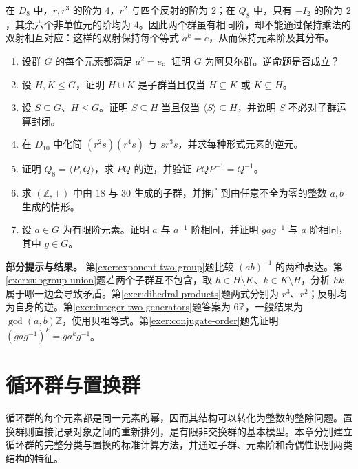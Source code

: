 \documentclass[UTF8,12pt,a4paper,fontset=fandol]{ctexbook}
\begin{document}
\begin{example}[区分两个八阶群]
在 $D_8$ 中，$r,r^3$ 的阶为 $4$，$r^2$ 与四个反射的阶为 $2$；在 $Q_8$ 中，只有 $-I_2$ 的阶为 $2$，其余六个非单位元的阶均为 $4$。因此两个群虽有相同阶，却不能通过保持乘法的双射相互对应：这样的双射保持每个等式 $a^k=e$，从而保持元素阶及其分布。
\end{example}

\begin{enumerate}
  \item\label{exer:exponent-two-group} 设群 $G$ 的每个元素都满足 $a^2=e$。证明 $G$ 为阿贝尔群。逆命题是否成立？
  \item\label{exer:subgroup-union} 设 $H,K\leq G$，证明 $H\cup K$ 是子群当且仅当 $H\subseteq K$ 或 $K\subseteq H$。
  \item\label{exer:generated-minimality} 设 $S\subseteq G$、$H\leq G$。证明 $S\subseteq H$ 当且仅当 $\langle S\rangle\subseteq H$，并说明 $S$ 不必对子群运算封闭。
  \item\label{exer:dihedral-products} 在 $D_{10}$ 中化简 $(r^2s)(r^4s)$ 与 $sr^3s$，并求每种形式元素的逆元。
  \item\label{exer:quaternion-relations} 证明 $Q_8=\langle P,Q\rangle$，求 $PQ$ 的逆，并验证 $PQP^{-1}=Q^{-1}$。
  \item\label{exer:integer-two-generators} 求 $(\mathbb Z,+)$ 中由 $18$ 与 $30$ 生成的子群，并推广到由任意不全为零的整数 $a,b$ 生成的情形。
  \item\label{exer:conjugate-order} 设 $a\in G$ 为有限阶元素。证明 $a$ 与 $a^{-1}$ 阶相同，并证明 $gag^{-1}$ 与 $a$ 阶相同，其中 $g\in G$。
\end{enumerate}

\textbf{部分提示与结果。} 第\ref{exer:exponent-two-group}题比较 $(ab)^{-1}$ 的两种表达。第\ref{exer:subgroup-union}题若两个子群互不包含，取 $h\in H\setminus K$、$k\in K\setminus H$，分析 $hk$ 属于哪一边会导致矛盾。第\ref{exer:dihedral-products}题两式分别为 $r^3$、$r^2$；反射均为自身的逆。第\ref{exer:integer-two-generators}题答案为 $6\mathbb Z$，一般结果为 $\gcd(a,b)\mathbb Z$，使用贝祖等式。第\ref{exer:conjugate-order}题先证明 $(gag^{-1})^k=ga^kg^{-1}$。

\chapter{循环群与置换群}\label{ch:cyclic-permutation}

循环群的每个元素都是同一元素的幂，因而其结构可以转化为整数的整除问题。置换群则直接记录对象之间的重新排列，是有限非交换群的基本模型。本章分别建立循环群的完整分类与置换的标准计算方法，并通过子群、元素阶和奇偶性识别两类结构的特征。
\end{document}
